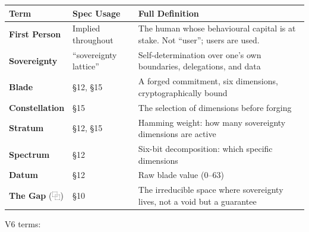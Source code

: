 \documentclass[
]{article}
\newcounter{none} %
\begin{document}
{\def\LTcaptype{none} %
\begin{longtable}[]{@{}
  >{\raggedright\arraybackslash}p{}
  >{\raggedright\arraybackslash}p{}
  >{\raggedright\arraybackslash}p{}@{}}
\toprule\noalign{}
\begin{minipage}[b]{\linewidth}\raggedright
Term
\end{minipage} & \begin{minipage}[b]{\linewidth}\raggedright
Spec Usage
\end{minipage} & \begin{minipage}[b]{\linewidth}\raggedright
Full Definition
\end{minipage} \\
\midrule\noalign{}
\endhead
\bottomrule\noalign{}
\endlastfoot
\textbf{First Person} & Implied throughout & The human whose behavioural
capital is at stake. Not ``user''; users are used. \\
\textbf{Sovereignty} & ``sovereignty lattice'' & Self-determination over
one's own boundaries, delegations, and data \\
\textbf{Blade} & §12, §15 & A forged commitment, six dimensions,
cryptographically bound \\
\textbf{Constellation} & §15 & The selection of dimensions before
forging \\
\textbf{Stratum} & §12, §15 & Hamming weight: how many sovereignty
dimensions are active \\
\textbf{Spectrum} & §12 & Six-bit decomposition: which specific
dimensions \\
\textbf{Datum} & §12 & Raw blade value (0--63) \\
\textbf{The Gap} (⿻) & §10 & The irreducible space where sovereignty
lives, not a void but a guarantee \\
\end{longtable}
}

V6 terms:
\end{document}
